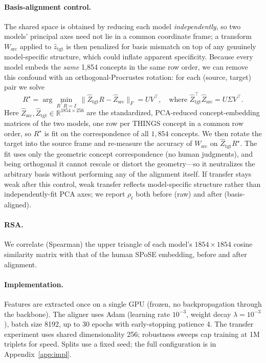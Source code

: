 \documentclass{article}
\begin{document}
\paragraph{Basis-alignment control.}\label{par:procrustes} The shared space is
obtained by reducing each model \emph{independently}, so two models' principal axes
need not lie in a common coordinate frame; a transform $W_{\text{src}}$ applied to
$\hat z_{\text{tgt}}$ is then penalized for basis mismatch on top of any genuinely
model-specific structure, which could inflate apparent specificity. Because every
model embeds the \emph{same} 1{,}854 concepts in the same row order, we can remove
this confound with an orthogonal-Procrustes rotation: for each (source, target) pair
we solve
\begin{equation}
R^\star = \arg\min_{R^\top R = I}\ \big\lVert \hat Z_{\text{tgt}} R - \hat Z_{\text{src}} \big\rVert_F
= U V^\top,\quad\text{where } \hat Z_{\text{tgt}}^\top \hat Z_{\text{src}} = U \Sigma V^\top.
\end{equation}
Here $\hat Z_{\text{src}}, \hat Z_{\text{tgt}} \in \mathbb{R}^{1854\times 256}$ are the
standardized, PCA-reduced concept-embedding matrices of the two models, one row per
THINGS concept in a common row order, so $R^\star$ is fit on the correspondence of all
$1{,}854$ concepts. We then
rotate the target into the source frame and re-measure the accuracy of
$W_{\text{src}}$ on $\hat Z_{\text{tgt}} R^\star$. The fit uses only the geometric
concept correspondence (no human judgments), and being orthogonal it cannot rescale
or distort the geometry---so it neutralizes the arbitrary basis without performing
any of the alignment itself. If transfer stays weak after this control, weak
transfer reflects model-specific structure rather than independently-fit PCA axes;
we report $\rho_t$ both before (raw) and after (basis-aligned).

\paragraph{RSA.} We correlate (Spearman) the upper triangle of each model's
$1854\times1854$ cosine similarity matrix with that of the human SPoSE embedding,
before and after alignment.

\paragraph{Implementation.} Features are extracted once on a single GPU
(frozen, no backpropagation through the backbone). The aligner uses Adam
(learning rate $10^{-3}$, weight decay $\lambda{=}10^{-3}$), batch size 8192, up
to 30 epochs with early-stopping patience 4. The transfer experiment uses
shared dimensionality 256; robustness sweeps cap training at 1M triplets for
speed. Splits use a fixed seed; the full configuration is in
Appendix~\ref{app:impl}.
\end{document}
